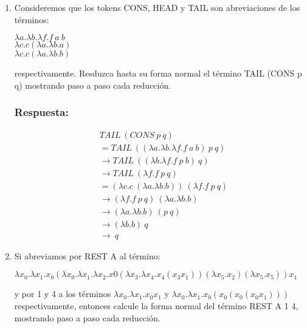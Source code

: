\documentclass{article}
\begin{document}
\begin{enumerate}

\item Consideremos que los tokens CONS, HEAD y TAIL son abreviaciones de los términos:

\begin{center}

$\lambda a . \lambda b . \lambda f . f\  a\  b$
\\$\lambda c . c (\lambda a . \lambda b . a)$
\\$\lambda c . c (\lambda a . \lambda b . b)$

\end{center}

respectivamente. Resduzca hasta su forma normal el término TAIL (CONS p q) mostrando paso a paso cada reducción.

\subsubsection*{Respuesta:}

\begin{align*}
&TAIL\ ( CONS\ p\ q )
\\&= TAIL\ ((\lambda a . \lambda b . \lambda f . f \  a \  b) \  p \  q)
\\&\rightarrow TAIL\  ((\lambda b . \lambda f . f \  p \  b)\  q)
\\&\rightarrow TAIL\  (\lambda f . f\ p\ q)
\\&= (\lambda c.c\ (\lambda a . \lambda b . b))\ (\lambda f . f\ p\ q)
\\&\rightarrow (\lambda f.f\ p\ q)\ (\lambda a.\lambda b.b)
\\&\rightarrow (\lambda a. \lambda b.b)\ (p\ q)
\\&\rightarrow (\lambda b.b)\ q
\\&\rightarrow \ q
\end{align*}


\item Si abreviamos por REST A al término:

\begin{center}
$
\lambda x_0 .\lambda x_1 . x_0 (\lambda x_0 .\lambda x_1 .\lambda x_2 . x0 (\lambda x_3 .\lambda x_4 . x_4 ( x_3 x_1 ))(\lambda x_5 . x_2 )(\lambda x_5 . x_5 )) x_1
$
\end{center}

y por 1 y 4 a los términos $ \lambda x_0 .\lambda x_1 . x_0 x_1 $ y $ \lambda x_0 . \lambda x_1 . x_0 ( x_0 ( x_0 ( x_0 x_1 ))) $ respectivamente, entonces calcule la forma normal del término REST A 1 4, mostrando paso a paso cada reducción.



\end{enumerate}
\end{document}

